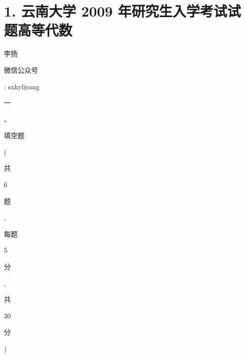 \documentclass[10pt]{article}
\begin{document}
\section{1. 云南大学 2009 年研究生入学考试试题高等代数}
\begin{CJK}{UTF8}{mj}李扬\end{CJK}

\begin{CJK}{UTF8}{mj}微信公众号\end{CJK}: sxkyliyang

\begin{CJK}{UTF8}{mj}一\end{CJK}、 \begin{CJK}{UTF8}{mj}填空题\end{CJK} (\begin{CJK}{UTF8}{mj}共\end{CJK} 6 \begin{CJK}{UTF8}{mj}题\end{CJK}, \begin{CJK}{UTF8}{mj}每题\end{CJK} 5 \begin{CJK}{UTF8}{mj}分\end{CJK}, \begin{CJK}{UTF8}{mj}共\end{CJK} 30 \begin{CJK}{UTF8}{mj}分\end{CJK})
\end{document}

